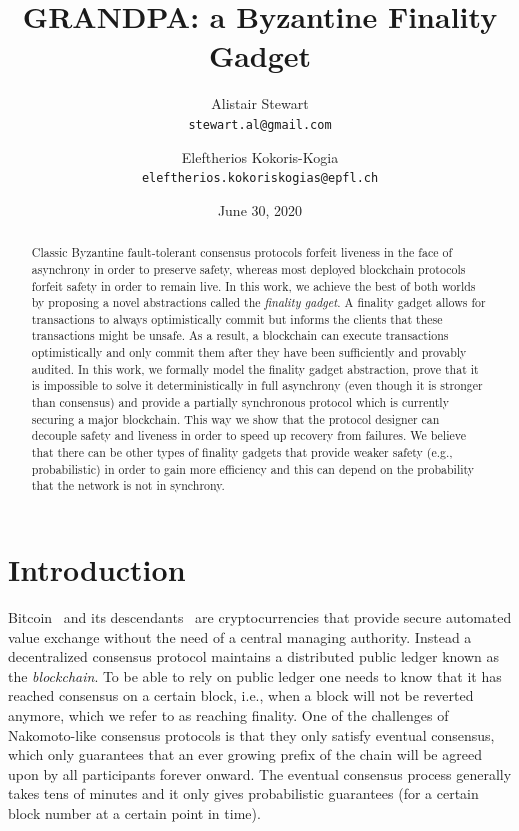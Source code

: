 \documentclass{article}
\begin{document}
\title{GRANDPA: a Byzantine Finality Gadget}
\author{Alistair Stewart \\ {\tt stewart.al@gmail.com} \and Eleftherios Kokoris-Kogia \\ {\tt eleftherios.kokoriskogias@epfl.ch}}
\date{June 30, 2020}
\maketitle

\begin{abstract}
Classic Byzantine fault-tolerant consensus protocols forfeit liveness in the face of asynchrony in order to preserve safety, whereas most deployed blockchain protocols forfeit safety in order to remain live. 
In this work, we achieve the best of both worlds by proposing a novel abstractions called the \emph{finality gadget}.
A finality gadget allows for transactions to always optimistically commit but informs the clients that these transactions might be unsafe. As a result, a blockchain can execute transactions optimistically and only commit them after they have been sufficiently and provably audited.
In this work, we formally model the finality gadget abstraction, prove that it is impossible to solve it deterministically in full asynchrony (even though it is stronger than consensus) and provide a partially synchronous protocol which is currently securing a major blockchain. This way we show that the protocol designer can decouple safety and liveness in order to speed up recovery from failures. We believe that there can be other types of finality gadgets that provide weaker safety (e.g., probabilistic) in order to gain more efficiency and this can depend on the probability that the network is not in synchrony.
\end{abstract}
\section{Introduction}


Bitcoin~\cite{nakamoto08bitcoin} and its descendants~\cite{wood14ethereum,sasson2014zerocash} are cryptocurrencies that provide 
secure automated value exchange without the need of a central managing authority.
Instead a decentralized consensus protocol maintains a distributed public ledger
known as the \textit{blockchain}. To be able to rely on public ledger one needs to know that it has reached consensus on a certain block, i.e., when a block will not be reverted anymore, which we refer to as reaching finality.  
One of the challenges of Nakomoto-like consensus protocols is that they only satisfy eventual consensus, which only guarantees that an ever growing prefix of the chain will be agreed upon by all participants forever onward. The eventual consensus process generally takes tens of minutes and it only gives probabilistic guarantees (for a certain block number at a certain point in time). 
\end{document}
